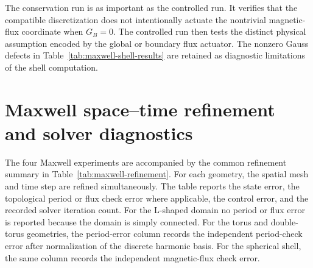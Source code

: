 \documentclass{article}
\begin{document}
The conservation run is as important as the controlled run.  It verifies that
the compatible discretization does not intentionally actuate the nontrivial
magnetic-flux coordinate when \(G_B=0\).  The controlled run then tests the
distinct physical assumption encoded by the global or boundary flux actuator.
The nonzero Gauss defects in Table~\ref{tab:maxwell-shell-results} are retained
as diagnostic limitations of the shell computation.
\section{Maxwell space--time refinement and solver diagnostics}
\label{sec:maxwell-refinement}

The four Maxwell experiments are accompanied by the common refinement
summary in Table~\ref{tab:maxwell-refinement}.  For each geometry, the spatial
mesh and time step are refined simultaneously.  The table reports the state
error, the topological period or flux check error where applicable, the
control error, and the recorded solver iteration count.  For the L-shaped
domain no period or flux error is reported because the domain is simply
connected.  For the torus and double-torus geometries, the period-error column
records the independent period-check error after normalization of the discrete
harmonic basis.  For the spherical shell, the same column records the
independent magnetic-flux check error.
\end{document}
